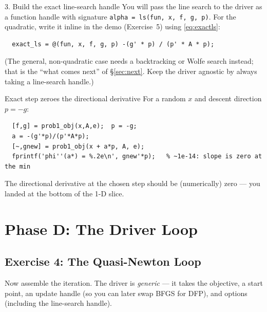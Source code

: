 \documentclass[11pt,letterpaper]{article}
\begin{document}
\begin{exercise}{3. Build the exact line-search handle}
You will pass the line search to the driver as a function handle with signature
\texttt{alpha = ls(fun, x, f, g, p)}. For the quadratic, write it inline in the demo
(Exercise~5) using \eqref{eq:exactls}:
\begin{verbatim}
  exact_ls = @(fun, x, f, g, p) -(g' * p) / (p' * A * p);
\end{verbatim}
(The general, non-quadratic case needs a backtracking or Wolfe search instead; that
is the ``what comes next'' of \S\ref{sec:next}. Keep the driver agnostic by always
taking a line-search handle.)
\end{exercise}

\begin{checkpoint}{Exact step zeroes the directional derivative}
For a random $x$ and descent direction $p=-g$:
\begin{verbatim}
  [f,g] = prob1_obj(x,A,e);  p = -g;
  a = -(g'*p)/(p'*A*p);
  [~,gnew] = prob1_obj(x + a*p, A, e);
  fprintf('phi''(a*) = %.2e\n', gnew'*p);   % ~1e-14: slope is zero at the min
\end{verbatim}
The directional derivative at the chosen step should be (numerically) zero --- you
landed at the bottom of the 1-D slice.
\end{checkpoint}

\section{Phase D: The Driver Loop}

\subsection{Exercise 4: The Quasi-Newton Loop}

Now assemble the iteration. The driver is \emph{generic} --- it takes the objective,
a start point, an update handle (so you can later swap BFGS for DFP), and options
(including the line-search handle).
\end{document}
